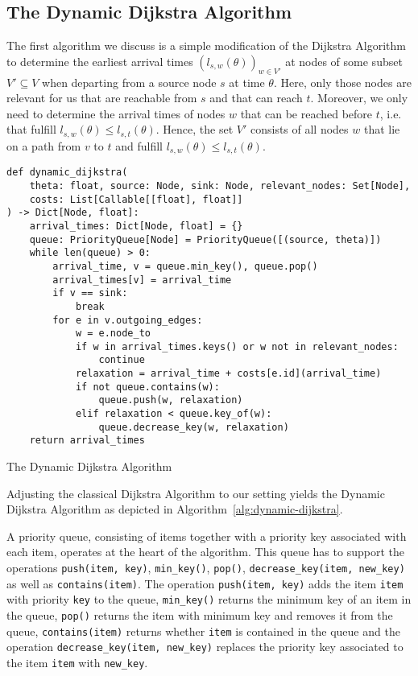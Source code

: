 \subsection{The Dynamic Dijkstra Algorithm}

The first algorithm we discuss is a simple modification of the Dijkstra Algorithm to determine the earliest arrival times $(l_{s,w}(\theta))_{w\in V'}$ at nodes of some subset $V'\subseteq V$ when departing from a source node $s$ at time $\theta$.
Here, only those nodes are relevant for us that are reachable from $s$ and that can reach $t$.
Moreover, we only need to determine the arrival times of nodes $w$ that can be reached before $t$, i.e. that fulfill $l_{s,w}(\theta) \leq l_{s,t}(\theta)$.
Hence, the set $V'$ consists of all nodes $w$ that lie on a path from $v$ to $t$ and fulfill $l_{s,w}(\theta) \leq l_{s,t}(\theta)$.

\begin{algorithm}[h]
\begin{verbatim}
def dynamic_dijkstra(
    theta: float, source: Node, sink: Node, relevant_nodes: Set[Node],
    costs: List[Callable[[float], float]]
) -> Dict[Node, float]:
    arrival_times: Dict[Node, float] = {}
    queue: PriorityQueue[Node] = PriorityQueue([(source, theta)])
    while len(queue) > 0:
        arrival_time, v = queue.min_key(), queue.pop()
        arrival_times[v] = arrival_time
        if v == sink:
            break
        for e in v.outgoing_edges:
            w = e.node_to
            if w in arrival_times.keys() or w not in relevant_nodes:
                continue
            relaxation = arrival_time + costs[e.id](arrival_time)
            if not queue.contains(w):
                queue.push(w, relaxation)
            elif relaxation < queue.key_of(w):
                queue.decrease_key(w, relaxation)
    return arrival_times
\end{verbatim}
\caption{The Dynamic Dijkstra Algorithm}
\label{alg:dynamic-dijkstra}
\end{algorithm}

Adjusting the classical Dijkstra Algorithm to our setting yields the Dynamic Dijkstra Algorithm as depicted in Algorithm~\ref{alg:dynamic-dijkstra}.

A priority queue, consisting of items together with a priority key associated with each item, operates at the heart of the algorithm.
This queue has to support the operations \texttt{push(item, key)}, \texttt{min\_key()}, \texttt{pop()}, \texttt{decrease\_key(item, new\_key)} as well as \texttt{contains(item)}.
The operation \texttt{push(item, key)} adds the item \texttt{item} with priority \texttt{key} to the queue, \texttt{min\_key()} returns the minimum key of an item in the queue, \texttt{pop()} returns the item with minimum key and removes it from the queue, \texttt{contains(item)} returns whether \texttt{item} is contained in the queue and the operation \texttt{decrease\_key(item, new\_key)} replaces the priority key associated to the item \texttt{item} with \texttt{new\_key}.



